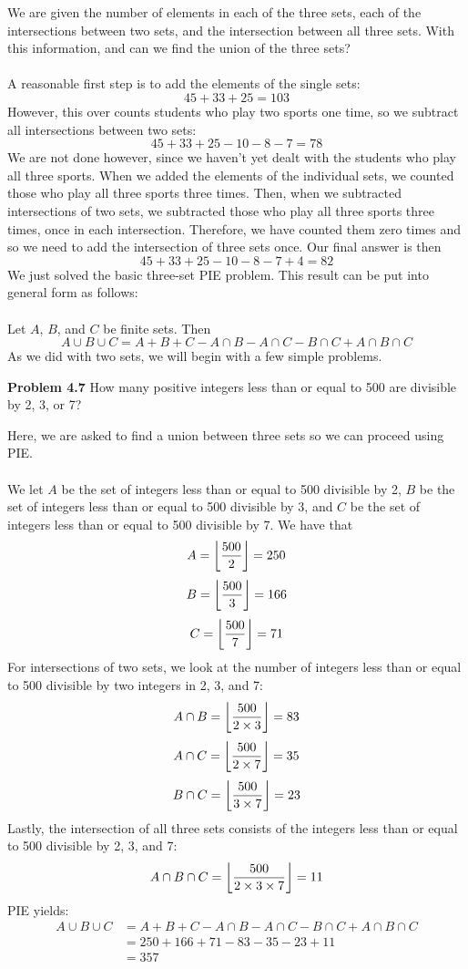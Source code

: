 \documentclass[11pt]{scrartcl}
\DeclarePairedDelimiter\floor{\lfloor}{\rfloor}
\begin{document}
\noindent 
We are given the number of elements in each of the three sets, each of the intersections between two sets, and the intersection between all three sets. With this information, and can we find the union of the three sets? \\
\\
\noindent
A reasonable first step is to add the elements of the single sets: 
$$45+33+25=103$$
\noindent
However, this over counts students who play two sports one time, so we subtract all intersections between two sets: 
$$45+33+25-10-8-7=78$$
\noindent
We are not done however, since we haven't yet dealt with the students who play all three sports. When we added the elements of the individual sets, we counted those who play all three sports three times. Then, when we subtracted intersections of two sets, we subtracted those who play all three sports three times, once in each intersection. Therefore, we have counted them zero times and so we need to add the intersection of three sets once. Our final answer is then 
$$45+33+25-10-8-7+4=82$$
\noindent 
We just solved the basic three-set PIE problem. This result can be put into general form as follows: \\
\\
\noindent 
Let $A$, $B$, and $C$ be finite sets. Then 
$${A \cup B \cup C}=A+B+C-{A \cap B}-{A \cap C}-{B \cap C}+{A \cap B \cap C}$$
\noindent 
As we did with two sets, we will begin with a few simple problems. 
\\
\begin{tcolorbox}
\textbf{Problem 4.7} How many positive integers less than or equal to 500 are divisible by 2, 3, or 7?
\end{tcolorbox}
\noindent 
Here, we are asked to find a union between three sets so we can proceed using PIE. \\
\\
\noindent
We let $A$ be the set of integers less than or equal to 500 divisible by 2, $B$ be the set of integers less than or equal to 500 divisible by 3, and $C$ be the set of integers less than or equal to 500 divisible by 7. We have that 
$$A={\floor*{\frac{500}{2}}}=250$$
$$B={\floor*{\frac{500}{3}}}=166$$
$$C= \floor*{\frac{500}{7}}=71$$
For intersections of two sets, we look at the number of integers less than or equal to 500 divisible by two integers in 2, 3, and 7: 
$$A \cap B={ \floor*{\frac{500}{2 \times 3}}}=83$$
$$A \cap C={ \floor*{\frac{500}{2 \times 7}}}=35$$
$$B \cap C={ \floor*{\frac{500}{3 \times 7}}}=23$$
Lastly, the intersection of all three sets consists of the integers less than or equal to 500 divisible by 2, 3, and 7: 
$$ {A \cap B \cap C}={\floor*{\frac{500}{2 \times 3 \times 7}}=11}$$
PIE yields: 
\begin{align*}
    A \cup B \cup C &={A}+{B}+{C}-{A \cap B}-{A \cap C}-{B \cap C}+{A \cap B \cap C} \\
                    &={250+166+71-83-35-23+11} \\
                    &=357
\end{align*}
\noindent 
\end{document}
